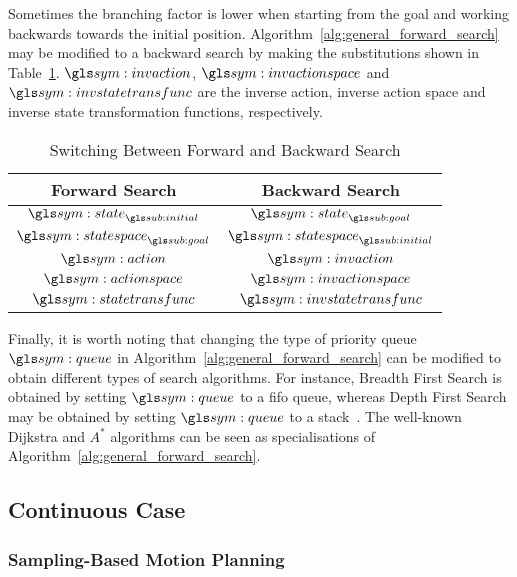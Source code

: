 		Sometimes the branching factor is lower when starting from the goal and
		working backwards towards the initial position.
		Algorithm~\ref{alg:general_forward_search} may be modified to a backward
		search by making the substitutions shown in
		Table~\ref{tab:switiching_between_forward_and_backward_search}.
		$\invaction$, $\invactionspace$ and $\invstatetransfunc$ are the inverse
		action, inverse action space and inverse state transformation functions,
		respectively.

		\begin{table}[ht]
			\centering
			\begin{tabular}{c  c}
				\toprule
				Forward Search 			& Backward Search\\
				\midrule
				$\state_{\initial}$		&	$\state_{\goal}$ 			\\
				$\statespace_{\goal}$	&	$\statespace_{\initial}$	\\
				$\action$ 				&	$\invaction$				\\
				$\actionspace$ 			&	$\invactionspace$			\\
				$\statetransfunc$ 		&	$\invstatetransfunc$		\\
			\end{tabular}
			\caption{Switching Between Forward and Backward Search}%
			\label{tab:switiching_between_forward_and_backward_search}
		\end{table}


		Finally, it is worth noting that changing the type of priority queue
		$\queue$ in Algorithm~\ref{alg:general_forward_search} can be modified
		to obtain different types of search algorithms. For instance, Breadth
		First Search is obtained by setting $\queue$ to a \gls{fifo} queue,
		whereas Depth First Search may be obtained by setting $\queue$ to a
		stack~\cite[][page 35]{bib:planning:planning_algorithms}. The well-known
		Dijkstra and $A^*$ algorithms can be seen as specialisations of
		Algorithm~\ref{alg:general_forward_search}.


	\subsection{Continuous Case}%
	\label{sec:continuous_case}

		\subsubsection{Sampling-Based Motion Planning}%
		\label{sec:sampling_based_motion_planning}

